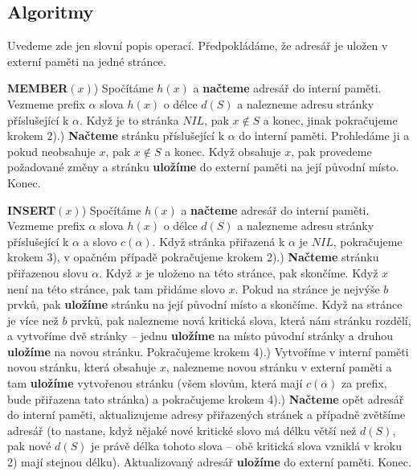\documentclass[a4paper,12pt]{article}
\begin{document}
\subsection{
Algoritmy
}


Uvedeme zde jen slovní popis operací. Předpokládáme, že adresář 
je uložen v externí paměti na jedné stránce.

{\bf MEMBER$(x)$}) Spočítáme $h(x)$ a {\bf načteme} adresář do interní paměti. 
Vez\-me\-me prefix $\alpha$ slova $h(x)$ o délce $d(S)$ a nalezneme 
adresu stránky příslušející k $\alpha$. Když je to stránka 
$NIL$, pak $x\notin S$ a konec, jinak pokračujeme krokem 
2).) {\bf Načteme} stránku příslušející k $\alpha$ do interní 
paměti. Prohle\-dá\-me ji a pokud neobsahuje $x$, pak $x\notin 
S$ a 
konec. Když obsahuje $x$, pak provedeme požadované 
změny a stránku {\bf ulo\-ží\-me} do externí paměti na její 
původní místo. Konec.

{\bf INSERT$(x)$}) Spočítáme $h(x)$ a {\bf načteme} adresář do interní paměti. 
Vez\-me\-me prefix $\alpha$ slova $h(x)$ o délce $d(S)$ a nalezneme 
adresu stránky příslušející k $\alpha$ a slovo $
c(\alpha )$. 
Když stránka přiřazená k $\alpha$ je $NIL$, pokraču\-je\-me krokem 
3), v opačném případě pokraču\-je\-me krokem 2).) {\bf Načteme} stránku přiřazenou slovu $\alpha$. Když $
x$ je 
uloženo na této stránce, pak skončíme. Když $x$ není na 
této stránce, pak tam přidáme slovo $x$. Pokud na stránce 
je nejvýše $b$ prvků, pak {\bf uložíme} stránku 
na její původní místo a skončíme. Když na 
stránce je více než $b$ prvků, pak nalezneme nová 
kritická slova, 
která nám stránku rozdělí, a vytvoříme dvě stránky -- 
jednu {\bf uložíme} na místo původní stránky a 
druhou {\bf uložíme} na novou stránku. Pokračujeme krokem 
4).) Vytvoříme v interní paměti novou stránku, která 
obsahuje $x$, nalezneme novou stránku v externí paměti a 
tam {\bf uložíme} vytvořenou stránku (všem slovům, 
která mají $c(\alpha )$ za prefix, bude přiřazena tato stránka) a 
pokračujeme krokem 4).) {\bf Načteme} opět adresář do interní paměti, 
aktualizujeme adresy přiřazených stránek a případně 
zvětšíme adresář (to nastane, když nějaké nové kritické 
slovo má délku větší než $d(S)$, pak nové $d(S
)$ je právě 
délka tohoto slova -- obě kritická slova vzniklá v kroku 
2) mají stejnou délku). Aktualizovaný adresář {\bf uložíme} do 
externí paměti. Konec.
\end{document}
